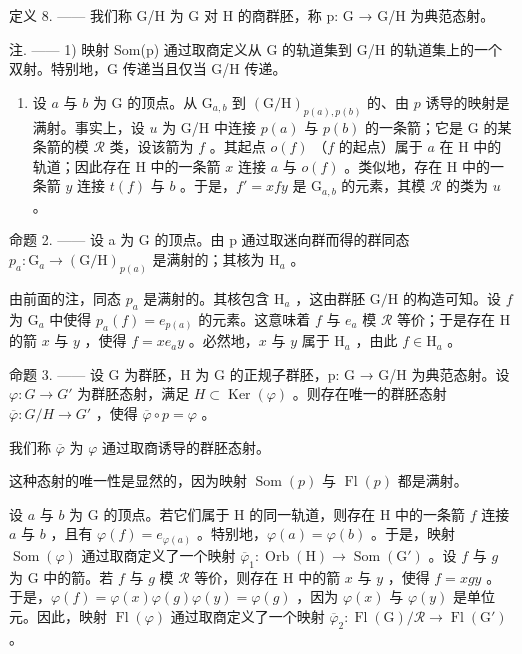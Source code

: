 定义 8. —— 我们称 G/H 为 G 对 H 的商群胚，称 p: G → G/H 为典范态射。

注. —— 1) 映射 Som(p) 通过取商定义从 G 的轨道集到 G/H 的轨道集上的一个双射。特别地，G 传递当且仅当 G/H 传递。

\begin{enumerate}
\def\labelenumi{\arabic{enumi})}
\setcounter{enumi}{1}
\tightlist
\item
  设 \(a\) 与 \(b\) 为 G 的顶点。从 \(\mathrm{G}_{a,b}\) 到 \((\mathrm{G} / \mathrm{H})_{p(a),p(b)}\) 的、由 \(p\) 诱导的映射是满射。事实上，设 \(u\) 为 G/H 中连接 \(p(a)\) 与 \(p(b)\) 的一条箭；它是 G 的某条箭的模 \(\mathcal{R}\) 类，设该箭为 \(f\) 。其起点 \(o(f)\) （\(f\) 的起点）属于 \(a\) 在 H 中的轨道；因此存在 H 中的一条箭 \(x\) 连接 \(a\) 与 \(o(f)\) 。类似地，存在 H 中的一条箭 \(y\) 连接 \(t(f)\) 与 \(b\) 。于是，\(f' = xfy\) 是 \(\mathrm{G}_{a,b}\) 的元素，其模 \(\mathcal{R}\) 的类为 \(u\) 。
\end{enumerate}

命题 2. —— 设 a 为 G 的顶点。由 p 通过取迷向群而得的群同态 \(p_{a}\colon\mathrm{G}_{a}\to(\mathrm{G}/\mathrm{H})_{p(a)}\) 是满射的；其核为 \(\mathrm{H}_{a}\) 。

由前面的注，同态 \(p_a\) 是满射的。其核包含 \(\mathrm{H}_a\) ，这由群胚 \(\mathrm{G / H}\) 的构造可知。设 \(f\) 为 \(\mathrm{G}_a\) 中使得 \(p_a(f) = e_{p(a)}\) 的元素。这意味着 \(f\) 与 \(e_a\) 模 \(\mathcal{R}\) 等价；于是存在 H 的箭 \(x\) 与 \(y\) ，使得 \(f = xe_a y\) 。必然地，\(x\) 与 \(y\) 属于 \(\mathrm{H}_a\) ，由此 \(f \in \mathrm{H}_a\) 。

命题 3. —— 设 G 为群胚，H 为 G 的正规子群胚，p: G → G/H 为典范态射。设 \(\varphi\colon G\to G'\) 为群胚态射，满足 \(H\subset\operatorname{Ker}(\varphi)\) 。则存在唯一的群胚态射 \(\overline{\varphi}\colon G/H\to G'\) ，使得 \(\overline{\varphi}\circ p=\varphi\) 。

我们称 \(\overline{\varphi}\) 为 \(\varphi\) 通过取商诱导的群胚态射。

这种态射的唯一性是显然的，因为映射 \(\operatorname{Som}(p)\) 与 \(\operatorname{Fl}(p)\) 都是满射。

设 \(a\) 与 \(b\) 为 G 的顶点。若它们属于 H 的同一轨道，则存在 H 中的一条箭 \(f\) 连接 \(a\) 与 \(b\) ，且有 \(\varphi(f) = e_{\varphi(a)}\) 。特别地，\(\varphi(a) = \varphi(b)\) 。于是，映射 \(\operatorname{Som}(\varphi)\) 通过取商定义了一个映射 \(\overline{\varphi}_1\colon \operatorname{Orb}(\mathrm{H}) \to \operatorname{Som}(\mathrm{G}')\) 。设 \(f\) 与 \(g\) 为 G 中的箭。若 \(f\) 与 \(g\) 模 \(\mathcal{R}\) 等价，则存在 H 中的箭 \(x\) 与 \(y\) ，使得 \(f = xgy\) 。于是，\(\varphi(f) = \varphi(x)\varphi(g)\varphi(y) = \varphi(g)\) ，因为 \(\varphi(x)\) 与 \(\varphi(y)\) 是单位元。因此，映射 \(\operatorname{Fl}(\varphi)\) 通过取商定义了一个映射 \(\overline{\varphi}_2\colon \operatorname{Fl}(\mathrm{G}) / \mathcal{R} \to \operatorname{Fl}(\mathrm{G}')\) 。

